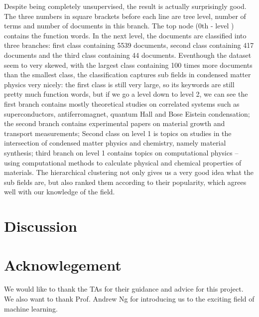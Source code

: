 \documentclass[DIV=calc, paper=letter, fontsize=10pt, twocolumn]{scrartcl}	 %
\begin{document}
Despite being completely unsupervised, the result is actually surprisingly good. The three numbers in square brackets before each line are tree level, number of terms and number of documents in this branch. The top node (0th - level ) contains the function words. In the next level, the documents are classified into three branches: first class containing 5539 documents, second class containing 417 documents and the third class containing 44 documents. Eventhough the dataset seem to very skewed, with the largest class containing 100 times more documents than the smallest class, the classification captures sub fields in condensed matter physics very nicely: the first class is still very large, so its keywords are still pretty much function words, but if we go a level down to level 2, we can see the first branch contains mostly theoretical studies on correlated systems such as superconductors, antiferromagnet, quantum Hall and Bose Eistein condensation; the second branch contains experimental papers on material growth and transport measurements; Second class on level 1 is topics on studies in the intersection of condensed matter physics and chemistry, namely material synthesis; third branch on level 1 contains topics on computational physics -- using computational methods to calculate physical and chemical properties of materials. The hierarchical clustering not only gives us a very good idea what the sub fields are, but also ranked them according to their popularity, which agrees well with our knowledge of the field.      

\section*{Discussion}

\section*{Acknowlegement}
We would like to thank the TAs for their guidance and advice for this project. We also want to thank Prof. Andrew Ng for introducing us to the exciting field of machine learning.  
\end{document}

